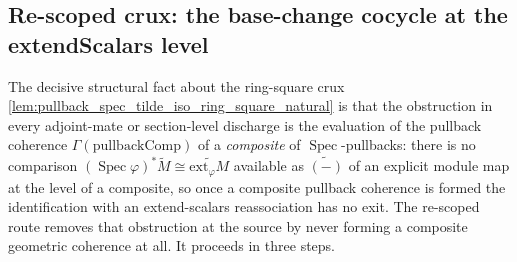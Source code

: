 \subsection{Re-scoped crux: the base-change cocycle at the extendScalars level}

The decisive structural fact about the ring-square crux
\cref{lem:pullback_spec_tilde_iso_ring_square_natural} is that the obstruction in every adjoint-mate
or section-level discharge is the evaluation of the pullback coherence
\(\Gamma(\mathrm{pullbackComp})\) of a \emph{composite} of \(\operatorname{Spec}\)-pullbacks: there
is no comparison \((\operatorname{Spec}\varphi)^{*}\widetilde M \cong \widetilde{\mathrm{ext}_\varphi M}\)
available as \(\widetilde{(-)}\) of an explicit module map at the level of a composite, so once a
composite pullback coherence is formed the identification with an extend-scalars reassociation has
no exit. The re-scoped route removes that obstruction at the source by never forming a composite
geometric coherence at all. It proceeds in three steps.

